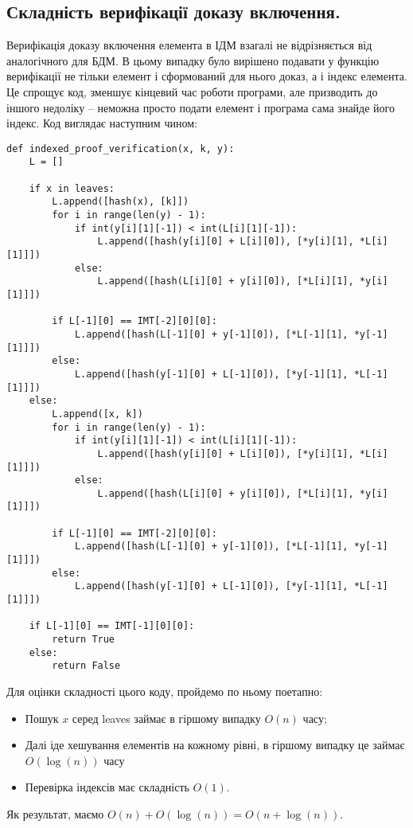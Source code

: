 \documentclass[a4paper, 12pt]{article}
\begin{document}
\subsection{Складність верифікації доказу включення.}
\par Верифікація доказу включення елемента в ІДМ взагалі не відрізняється від аналогічного для БДМ. В цьому випадку було вирішено подавати у функцію верифікації не тільки елемент і сформований для нього доказ, а і індекс елемента. Це спрощує код, зменшує кінцевий час роботи програми, але призводить до іншого недоліку -- неможна просто подати елемент і програма сама знайде його індекс. Код виглядає наступним чином:
\begin{lstlisting}
def indexed_proof_verification(x, k, y):
    L = []
    
    if x in leaves:
        L.append([hash(x), [k]])
        for i in range(len(y) - 1):
            if int(y[i][1][-1]) < int(L[i][1][-1]):
                L.append([hash(y[i][0] + L[i][0]), [*y[i][1], *L[i][1]]])
            else:
                L.append([hash(L[i][0] + y[i][0]), [*L[i][1], *y[i][1]]])
            
        if L[-1][0] == IMT[-2][0][0]:
            L.append([hash(L[-1][0] + y[-1][0]), [*L[-1][1], *y[-1][1]]])
        else:
            L.append([hash(y[-1][0] + L[-1][0]), [*y[-1][1], *L[-1][1]]])
    else:
        L.append([x, k])
        for i in range(len(y) - 1):
            if int(y[i][1][-1]) < int(L[i][1][-1]):
                L.append([hash(y[i][0] + L[i][0]), [*y[i][1], *L[i][1]]])
            else:
                L.append([hash(L[i][0] + y[i][0]), [*L[i][1], *y[i][1]]])
            
        if L[-1][0] == IMT[-2][0][0]:
            L.append([hash(L[-1][0] + y[-1][0]), [*L[-1][1], *y[-1][1]]])
        else:
            L.append([hash(y[-1][0] + L[-1][0]), [*y[-1][1], *L[-1][1]]])
            
    if L[-1][0] == IMT[-1][0][0]:
        return True
    else:
        return False
\end{lstlisting}

\par Для оцінки складності цього коду, пройдемо по ньому поетапно:
\begin{itemize}
	\item Пошук $x$ серед leaves займає в гіршому випадку $O(n)$ часу;
	\item Далі іде хешування елементів на кожному рівні, в гіршому випадку це займає $O(\log(n))$ часу
	\item Перевірка індексів має складність $O(1)$.
\end{itemize}
\par Як результат, маємо $O(n) + O(\log(n)) = O(n + \log(n))$.
\newline
\end{document}
